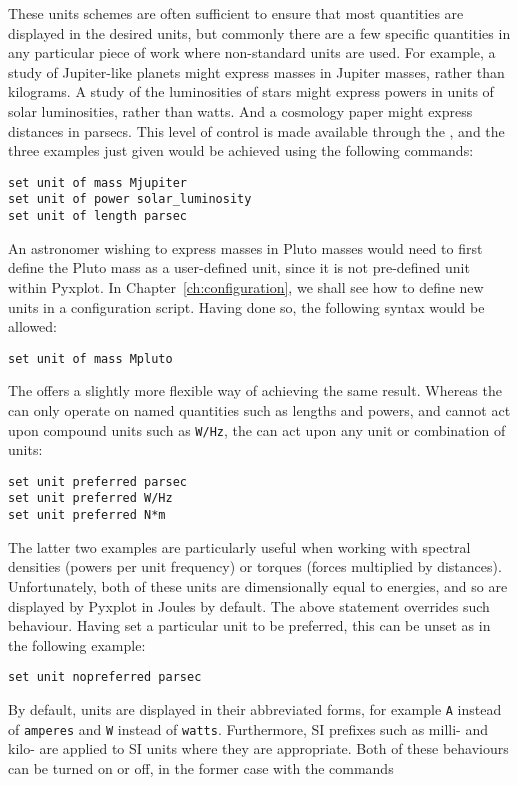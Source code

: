 These units schemes are often sufficient to ensure that most quantities are
displayed in the desired units, but commonly there are a few specific
quantities in any particular piece of work where non-standard units are used.
For example, a study of Jupiter-like planets might express masses in Jupiter
masses, rather than kilograms. A study of the luminosities of stars might
express powers in units of solar luminosities, rather than watts. And a
cosmology paper might express distances in parsecs. This level of control is
made available through the , and the three examples just
given would be achieved using the following commands:
\begin{verbatim}
set unit of mass Mjupiter
set unit of power solar_luminosity
set unit of length parsec
\end{verbatim}

An astronomer wishing to express masses in Pluto masses would need to first
define the Pluto mass as a user-defined unit, since it is not pre-defined unit
within Pyxplot. In Chapter~\ref{ch:configuration}, we shall see how to define
new units in a configuration script. Having done so, the following syntax would
be allowed:
\begin{verbatim}
set unit of mass Mpluto
\end{verbatim}

The  offers a slightly more flexible way of
achieving the same result. Whereas the  can only operate
on named quantities such as lengths and powers, and cannot act upon compound
units such as {\tt W/Hz}, the  can act upon any
unit or combination of units:
\begin{verbatim}
set unit preferred parsec
set unit preferred W/Hz
set unit preferred N*m
\end{verbatim}
The latter two examples are particularly useful when working with spectral
densities (powers per unit frequency) or torques (forces multiplied by
distances). Unfortunately, both of these units are dimensionally equal to
energies, and so are displayed by Pyxplot in Joules by default. The above
statement overrides such behaviour. Having set a particular unit to be
preferred, this can be unset as in the following example:
\begin{verbatim}
set unit nopreferred parsec
\end{verbatim}

By default, units are displayed in their abbreviated forms, for example {\tt A}
instead of {\tt amperes} and {\tt W} instead of {\tt watts}. Furthermore, SI
prefixes such as milli- and kilo- are applied to SI units where they are
appropriate. Both of these
behaviours can be turned on or off, in the former case with the commands

